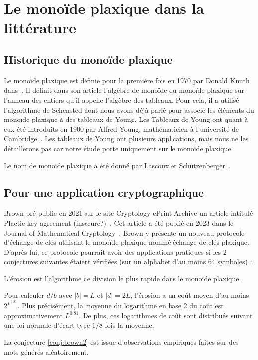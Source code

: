 \section{Le monoïde plaxique dans la littérature}

\subsection{Historique du monoïde plaxique}
Le monoïde plaxique est définie pour la première fois en 1970 par Donald Knuth dans~\cite{knuth1970permutations}. Il définit dans son article l'algèbre de monoïde du monoïde plaxique sur l'anneau des entiers qu'il appelle l'algèbre des tableaux. Pour cela, il a utilisé l'algorithme de Schensted dont nous avons déjà parlé pour associé les éléments du monoïde plaxique à des tableaux de Young. Les Tableaux de Young ont quant à eux été introduits en 1900 par Alfred Young, mathématicien à l'université de Cambridge~\cite{young1900quantitative}. Les tableaux de Young ont plusieurs applications, mais nous ne les détaillerons pas car notre étude porte uniquement sur le monoïde plaxique.

Le nom de monoïde plaxique a été donné par Lascoux et Schützenberger~\cite{lascoux1981monoide}. 

\subsection{Pour une application cryptographique} \label{etat_recherche}
Brown pré-publie en 2021 sur le site Cryptology ePrint Archive un article intitulé Plactic key agreement (insecure?)~\cite{brown2021plactic}. Cet article a été publié en 2023 dans le Journal of Mathematical Cryptology~\cite{Brown+2023}. Brown y présente un nouveau protocole d'échange de clés utilisant le monoïde plaxique nommé échange de clés plaxique. D'après lui, ce  protocole pourrait avoir des applications pratiques si les 2 conjectures suivantes étaient vérifiées (sur un alphabet d'au moins 64 symboles) : 
\begin{conjecture} \label{conj:brown1}
  L'érosion est l'algorithme de division le plus rapide dans le monoïde plaxique.
\end{conjecture}
\begin{conjecture} \label{conj:brown2}
  Pour calculer $d/b$ avec $|b|=L$ et $|d|=2L$, l'érosion a un coût moyen d'au moins $2^{L^{0.81}}$. Plus précisément, la moyenne du logarithme en base 2 du coût est approximativement $L^{0.81}$. De plus, ces logarithmes de coût sont distribués suivant une loi normale d'écart type $1/8$ fois la moyenne.
\end{conjecture}
La conjecture \ref{conj:brown2} est issue d'observations empiriques faites sur des mots générés aléatoirement.

